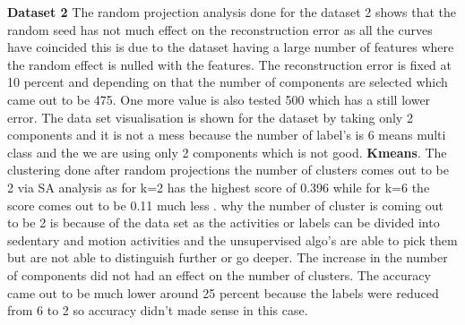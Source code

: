 \documentclass[a4paper,12pt]{article}
\begin{document}
\textbf{ Dataset 2} The random projection analysis done for the dataset 2 shows that the random seed has not much effect on the reconstruction error as all the curves have coincided this is due to the dataset having a large number of features where the random effect is nulled with the features. The reconstruction error is fixed at 10 percent and depending on that the number of components are selected which came out to be 475. One more value is also tested 500 which has a still lower error. The data set visualisation is shown for the dataset by taking only 2 components and it is not a mess because the number of label's is 6 means multi class and the we are using only 2 components which is not good. 
\textbf{Kmeans}. The clustering done after random projections the number of clusters comes out to be 2 via SA analysis as for k=2 has the highest score of 0.396 while for  k=6 the score comes out to be 0.11 much less . why the number of cluster is coming out to be 2 is because of the data set as the activities or labels can be divided into sedentary and motion activities and the unsupervised algo's are able to pick them but are not able to distinguish further or go deeper. The increase in the number of components did not had an effect on the number of clusters. The accuracy came out to be much lower around 25 percent because the labels were reduced from 6 to 2 so accuracy didn't made sense in this case.
\end{document}
